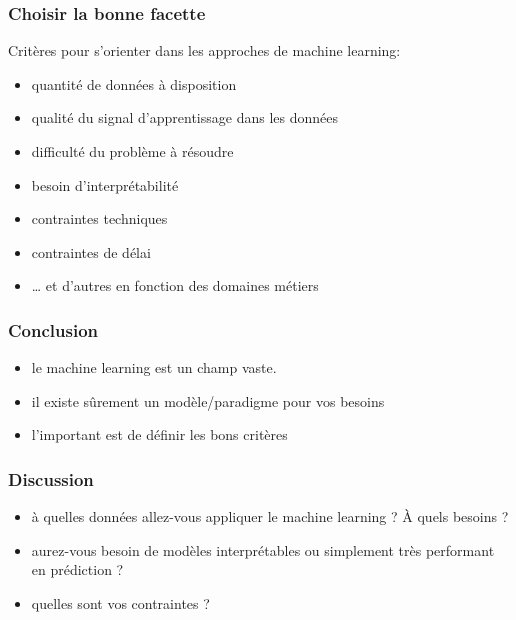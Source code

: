 \begin{frame}
  \frametitle{Choisir la bonne facette}
  Critères pour s'orienter dans les approches de machine learning:
  \begin{itemize}[<+->]
  \item quantité de données à disposition
  \item qualité du signal d'apprentissage dans les données
  \item difficulté du problème à résoudre
  \item besoin d'interprétabilité
  \item contraintes techniques
  \item contraintes de délai
  \item … et d'autres en fonction des domaines métiers
  \end{itemize}
\end{frame}

\begin{frame}
  \frametitle{Conclusion}
  \begin{itemize}
  \item le machine learning est un champ vaste.
  \item il existe sûrement un modèle/paradigme pour vos besoins
  \item l'important est de définir les bons critères
  \end{itemize}
\end{frame}

\begin{frame}
  \frametitle{Discussion}
  \begin{itemize}
  \item à quelles données allez-vous appliquer le machine learning ? À
    quels besoins ?
  \item aurez-vous besoin de modèles interprétables ou simplement très
    performant en prédiction ?
  \item quelles sont vos contraintes ?
  \end{itemize}
\end{frame}
